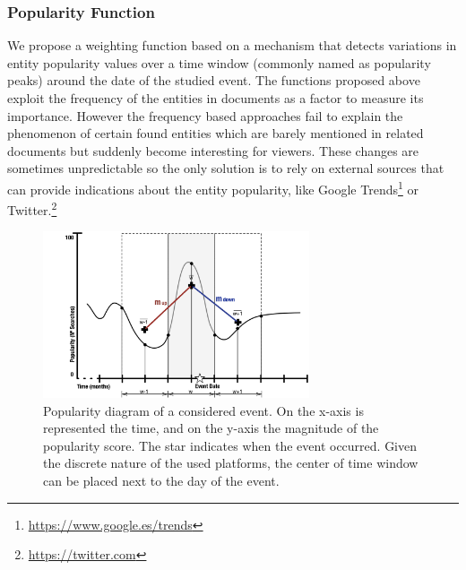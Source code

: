 \documentclass{llncs}
\begin{document}
\subsubsection{Popularity Function}
We propose a weighting function based on a mechanism that detects variations in entity popularity values over a time window (commonly named as popularity peaks) around the date of the studied event. The functions proposed above exploit the frequency of the entities in documents as a factor to measure its importance. However the frequency based approaches fail to explain the phenomenon of certain found entities which are barely mentioned in related documents but suddenly become interesting for viewers. These changes are sometimes unpredictable so the only solution is to rely on external sources that can provide indications about the entity popularity, like Google Trends\footnote{\url{https://www.google.es/trends}} or Twitter.\footnote{\url{https://twitter.com}}
\begin{figure}[h!]
\centering
\includegraphics[width=0.7\textwidth]{figure/PopularityMeasure}
\caption{Popularity diagram of a considered event. On the x-axis is represented the time, and on the y-axis the magnitude of the popularity score. The star indicates when the event occurred. Given the discrete nature of the used platforms, the center of time window can be placed next to the day of the event.}
\label{fig:PopularityMeasure}%
\end{figure}
\end{document}
